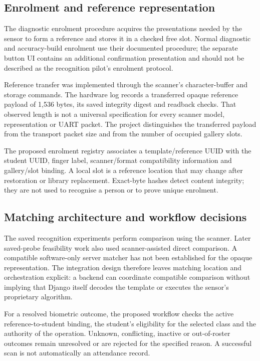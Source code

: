 \subsection{Enrolment and reference representation}\label{sec:3-8-1}

The diagnostic enrolment procedure acquires the presentations needed by the sensor to form a reference and stores it in a checked free slot. Normal diagnostic and accuracy-build enrolment use their documented procedure; the separate button UI contains an additional confirmation presentation and should not be described as the recognition pilot's enrolment protocol.

Reference transfer was implemented through the scanner's character-buffer and storage commands. The hardware log records a transferred opaque reference payload of 1,536 bytes, its saved integrity digest and readback checks. That observed length is not a universal specification for every scanner model, representation or UART packet. The project distinguishes the transferred payload from the transport packet size and from the number of occupied gallery slots.

The proposed enrolment registry associates a template/reference UUID with the student UUID, finger label, scanner/format compatibility information and gallery/slot binding. A local slot is a reference location that may change after restoration or library replacement. Exact-byte hashes detect content integrity; they are not used to recognise a person or to prove unique enrolment.

\subsection{Matching architecture and workflow decisions}\label{sec:3-8-2}

The saved recognition experiments perform comparison using the scanner. Later saved-probe feasibility work also used scanner-assisted direct comparison. A compatible software-only server matcher has not been established for the opaque representation. The integration design therefore leaves matching location and orchestration explicit: a backend can coordinate compatible comparison without implying that Django itself decodes the template or executes the sensor's proprietary algorithm.

For a resolved biometric outcome, the proposed workflow checks the active reference-to-student binding, the student's eligibility for the selected class and the authority of the operation. Unknown, conflicting, inactive or out-of-roster outcomes remain unresolved or are rejected for the specified reason. A successful scan is not automatically an attendance record.

